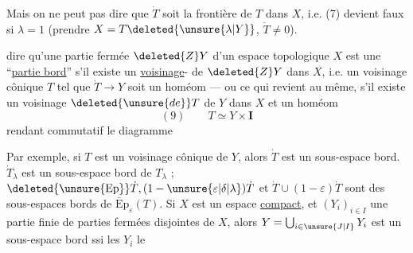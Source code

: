 Mais on ne peut pas dire  que $\dot T$ soit la frontière
de $T$ dans $X$, i.e. (7) devient faux si $\lambda=1$
(prendre $X=T\deleted{\unsure{\lambda|Y}}$,  $\dot T\neq0$).


   dire qu'une partie fermée $\deleted{Z}Y$ d'un
espace topologique $X$ est une ``\uline{partie bord}''
s'il existe un \uline{voisinage}-
 de $\deleted{Z}Y$ dans $X$,
i.e. un voisinage  cônique $T$ tel que
$\dot T\longrightarrow Y$ soit un homéom --- ou ce qui revient
au même,  s'il existe un
voisinage $\deleted{\unsure{de}}T$ de $Y$ dans $X$ et un homéom
\[
(9)\qquad T\simeq Y\times\mathbf{I}
\]
rendant commutatif le diagramme

Par exemple, si $T$ est un voisinage  cônique
 de  $Y$, alors $\dot T$ est un sous-espace bord.
 $\dot T_\lambda$ est un sous-espace bord de $T_\lambda$ ;
$\deleted{\unsure{\mathrm{Ep}}}\dot T,(1-\unsure{\varepsilon|\delta|\lambda})\dot T$
et $\dot T\cup(1-\varepsilon)\dot T$ sont des sous-espaces
bords de $\bar{\mathrm{E}}\mathrm{p}_\varepsilon(T)$. 
Si $X$ est un espace
\uline{compact}, et $(Y_i)_{i\in I}$ une partie finie de
parties fermées disjointes de $X$, alors
$Y=\bigcup_{i\in\unsure{J|I}}Y_i$ est un sous-espace bord ssi les $Y_i$ le 

